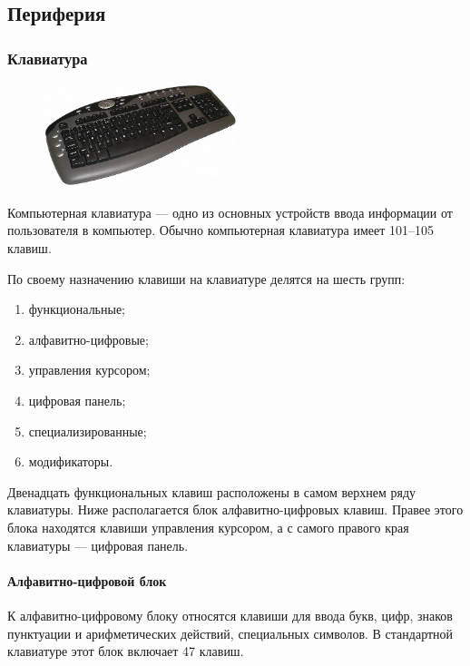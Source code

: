 \subsection{Периферия}\label{base:introduction:components:peripheral}
\subsubsection{Клавиатура}\label{base:introduction:components:peripheral:keyboard}
\begin{figure}
 \centering
 \includegraphics[width=0.5\textwidth]{base/Introduction/Keyboard.jpg}
\end{figure}
Компьютерная клавиатура --- одно из основных устройств ввода информации от пользователя в компьютер.
Обычно компьютерная клавиатура имеет 101--105 клавиш.

По своему назначению клавиши на клавиатуре делятся на шесть групп:
\begin{enumerate}
 \item функциональные;
 \item алфавитно-цифровые;
 \item управления курсором;
 \item цифровая панель;
 \item специализированные;
 \item модификаторы.
\end{enumerate}

Двенадцать функциональных клавиш расположены в самом верхнем ряду клавиатуры.
Ниже располагается блок алфавитно-цифровых клавиш.
Правее этого блока находятся клавиши управления курсором, а с самого правого края клавиатуры --- цифровая панель.

\paragraph{Алфавитно-цифровой блок}
К алфавитно-цифровому блоку относятся клавиши для ввода букв, цифр, знаков пунктуации и арифметических действий, специальных символов.
В стандартной клавиатуре этот блок включает 47 клавиш.

